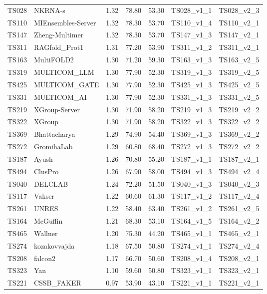 \begin{longtable}{lllllll}
TS028 & NKRNA-s & 1.32 & 78.80 & 53.30 & TS028\_v1\_1 & TS028\_v2\_3 \\ 
TS110 & MIEnsembles-Server & 1.32 & 78.30 & 53.70 & TS110\_v1\_4 & TS110\_v2\_1 \\ 
TS147 & Zheng-Multimer & 1.32 & 78.30 & 53.70 & TS147\_v1\_3 & TS147\_v2\_1 \\ 
TS311 & RAGfold\_Prot1 & 1.31 & 77.20 & 53.90 & TS311\_v1\_2 & TS311\_v2\_1 \\ 
TS163 & MultiFOLD2 & 1.30 & 71.20 & 59.30 & TS163\_v1\_3 & TS163\_v2\_5 \\ 
TS319 & MULTICOM\_LLM & 1.30 & 77.90 & 52.30 & TS319\_v1\_3 & TS319\_v2\_5 \\ 
TS425 & MULTICOM\_GATE & 1.30 & 77.90 & 52.30 & TS425\_v1\_3 & TS425\_v2\_5 \\ 
TS331 & MULTICOM\_AI & 1.30 & 77.90 & 52.30 & TS331\_v1\_3 & TS331\_v2\_5 \\ 
TS219 & XGroup-Server & 1.30 & 71.90 & 58.20 & TS219\_v1\_3 & TS219\_v2\_2 \\ 
TS322 & XGroup & 1.30 & 71.90 & 58.20 & TS322\_v1\_3 & TS322\_v2\_2 \\ 
TS369 & Bhattacharya & 1.29 & 74.90 & 54.40 & TS369\_v1\_3 & TS369\_v2\_2 \\ 
TS272 & GromihaLab & 1.29 & 60.80 & 68.40 & TS272\_v1\_3 & TS272\_v2\_2 \\ 
TS187 & Ayush & 1.26 & 70.80 & 55.20 & TS187\_v1\_1 & TS187\_v2\_1 \\ 
TS494 & ClusPro & 1.26 & 67.90 & 58.00 & TS494\_v1\_3 & TS494\_v2\_4 \\ 
TS040 & DELCLAB & 1.24 & 72.20 & 51.50 & TS040\_v1\_3 & TS040\_v2\_3 \\ 
TS117 & Vakser & 1.22 & 60.60 & 61.30 & TS117\_v1\_2 & TS117\_v2\_4 \\ 
TS261 & UNRES & 1.22 & 58.40 & 63.40 & TS261\_v1\_2 & TS261\_v2\_5 \\ 
TS164 & McGuffin & 1.21 & 68.30 & 53.10 & TS164\_v1\_5 & TS164\_v2\_2 \\ 
TS465 & Wallner & 1.20 & 75.30 & 44.20 & TS465\_v1\_1 & TS465\_v2\_1 \\ 
TS274 & kozakovvajda & 1.18 & 67.50 & 50.80 & TS274\_v1\_1 & TS274\_v2\_4 \\ 
TS208 & falcon2 & 1.17 & 66.70 & 50.60 & TS208\_v1\_4 & TS208\_v2\_1 \\ 
TS323 & Yan & 1.10 & 59.60 & 50.80 & TS323\_v1\_1 & TS323\_v2\_1 \\ 
TS221 & CSSB\_FAKER & 0.97 & 53.90 & 43.10 & TS221\_v1\_1 & TS221\_v2\_1 \\ 

\end{longtable}
